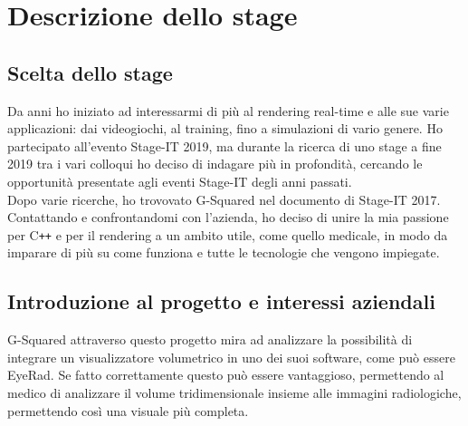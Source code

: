 
\chapter{Descrizione dello stage}
\label{cap:descrizione-stage}

\section{Scelta dello stage}
\label{scelta-dello-stage}
Da anni ho iniziato ad interessarmi di più al rendering real-time e alle sue varie applicazioni: dai videogiochi, al training, fino a simulazioni di vario genere.
Ho partecipato all'evento Stage-IT 2019, ma durante la ricerca di uno stage a fine 2019 tra i vari colloqui ho deciso di indagare più in profondità, cercando le opportunità presentate agli eventi Stage-IT degli anni passati. \\
Dopo varie ricerche, ho trovovato G-Squared nel documento di Stage-IT 2017. Contattando e confrontandomi con l'azienda, ho deciso di unire la mia passione per C\texttt{++} e per il rendering a un ambito utile, come quello medicale, in modo da imparare di più su come funziona e tutte le tecnologie che vengono impiegate.

\section{Introduzione al progetto e interessi aziendali}
G-Squared attraverso questo progetto mira ad analizzare la possibilità di integrare un visualizzatore volumetrico in uno dei suoi software, come può essere EyeRad. Se fatto correttamente questo può essere vantaggioso, permettendo al medico di analizzare il volume tridimensionale insieme alle immagini radiologiche, permettendo così una visuale più completa.

